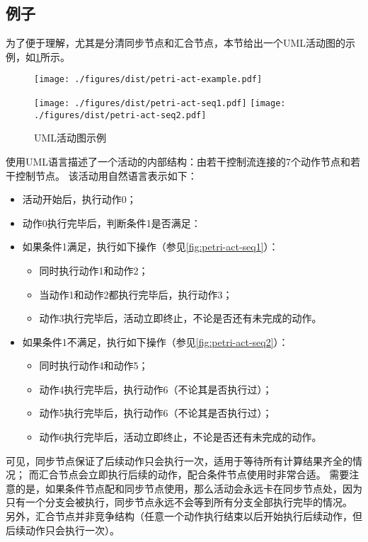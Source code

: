 \documentclass[index]{subfiles}
\begin{document}
\subsection{例子}
为了便于理解，尤其是分清同步节点和汇合节点，本节给出一个UML活动图的示例，如\cref{fig:petri-act}所示。
\begin{figure}[h]
  \centering%
    {\texttt{[image: ./figures/dist/petri-act-example.pdf]}}\par
    {\texttt{[image: ./figures/dist/petri-act-seq1.pdf]}}
  \hspace{10em}
    {\texttt{[image: ./figures/dist/petri-act-seq2.pdf]}}
  \caption{UML活动图示例\label{fig:petri-act}}
\end{figure}

使用UML语言描述了一个活动的内部结构：由若干控制流连接的7个动作节点和若干控制节点。
该活动用自然语言表示如下：
\begin{itemize}
  \item 活动开始后，执行动作0；
  \item 动作0执行完毕后，判断条件1是否满足：
  \item 如果条件1满足，执行如下操作（参见\cref{fig:petri-act-seq1}）：
  \begin{itemize}
    \item 同时执行动作1和动作2；
    \item 当动作1和动作2都执行完毕后，执行动作3；
    \item 动作3执行完毕后，活动立即终止，不论是否还有未完成的动作。
  \end{itemize}
  \item 如果条件1不满足，执行如下操作（参见\cref{fig:petri-act-seq2}）：
  \begin{itemize}
    \item 同时执行动作4和动作5；
    \item 动作4执行完毕后，执行动作6（不论其是否执行过）；
    \item 动作5执行完毕后，执行动作6（不论其是否执行过）；
    \item 动作6执行完毕后，活动立即终止，不论是否还有未完成的动作。
  \end{itemize}
\end{itemize}

可见，同步节点保证了后续动作只会执行一次，适用于等待所有计算结果齐全的情况；
而汇合节点会立即执行后续的动作，配合条件节点使用时非常合适。
需要注意的是，如果条件节点配和同步节点使用，那么活动会永远卡在同步节点处，因为只有一个分支会被执行，同步节点永远不会等到所有分支全部执行完毕的情况。
另外，汇合节点并非竞争结构（任意一个动作执行结束以后开始执行后续动作，但后续动作只会执行一次）。
\end{document}
